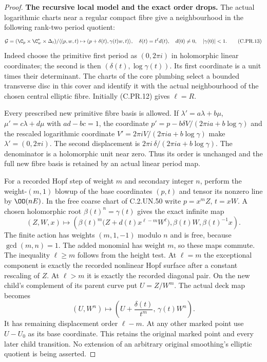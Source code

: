 \begin{proof}
\par\medskip\noindent\textbf{The recursive local model and the exact order drops.}
The actual logarithmic charts near a regular compact fibre give
a neighbourhood in the following rank-two period quotient:
\[
 \mathcal G=
 (\C_p\times\C_w^*\times\Delta_t)/
 \langle(p,w,t)\mapsto(p+\delta(t),\gamma(t)w,t)\rangle,
 \quad
 \delta(t)=t^\ell d(t),\quad d(0)\ne0,\quad|\gamma(0)|<1 .
                                                        \tag{C.PR.13}
\]
Indeed choose the primitive first period as $(0,2\pi i)$ in
holomorphic linear coordinates; the second is then
$(\delta(t),\log\gamma(t))$. Its first coordinate is a unit
times their determinant. The charts of the core plumbing select
a bounded transverse disc in this cover and identify it with
the actual neighbourhood of the chosen central elliptic fibre.
Initially (C.PR.12) gives $\ell=R$.

Every prescribed new primitive fibre basis is allowed. If
$\lambda'=a\lambda+b\mu$, $\mu'=c\lambda+d\mu$ with
$ad-bc=1$, the coordinate
$p'=p-b\delta V/(2\pi ia+b\log\gamma)$ and the rescaled
logarithmic coordinate
$V'=2\pi iV/(2\pi ia+b\log\gamma)$ make $\lambda'=(0,2\pi i)$.
The second displacement is
$2\pi i\,\delta/(2\pi ia+b\log\gamma)$.
The denominator is a holomorphic unit near zero.
Thus its order is unchanged and the full new fibre basis is
retained by an actual linear period map.

For a recorded Hopf step of weight $m$ and secondary integer $n$,
perform the weight-$(m,1)$ blowup of the base coordinates $(p,t)$
and tensor its nonzero line by $\OO(nE)$. In the free coarse
chart of C.2.UN.50 write $p=x^mZ$, $t=xW$.
A chosen holomorphic root $\beta(t)^n=\gamma(t)$ gives the exact
infinite map
\[
 (Z,W,x)\longmapsto
 \left(\beta(t)^m
    \bigl(Z+d(t)x^{\ell-m}W^\ell\bigr),
       \beta(t)W,\beta(t)^{-1}x\right).
                                                        \tag{C.PR.14}
\]
The finite action has weights $(m,1,-1)$ modulo $n$ and is free,
because $\gcd(m,n)=1$. The added monomial has weight $m$,
so these maps commute. The inequality $\ell\ge m$ follows
from the height test. At $\ell=m$ the exceptional component
is exactly the recorded nonlinear Hopf surface after a constant
rescaling of $Z$. At $\ell>m$ it is exactly the recorded
diagonal pair. On the new child's complement of its parent curve
put $U=Z/W^m$. The actual deck map becomes
\[
        (U,W^n)\longmapsto
       \left(U+\frac{\delta(t)}{t^m},\,\gamma(t)W^n\right).
                                                        \tag{C.PR.15}
\]
It has remaining displacement order $\ell-m$.
At any other marked point use $U-U_0$ as its base coordinate.
This retains the original marked point and every later child
transition. No extension of an arbitrary original smoothing's
elliptic quotient is being asserted.


\end{proof}
